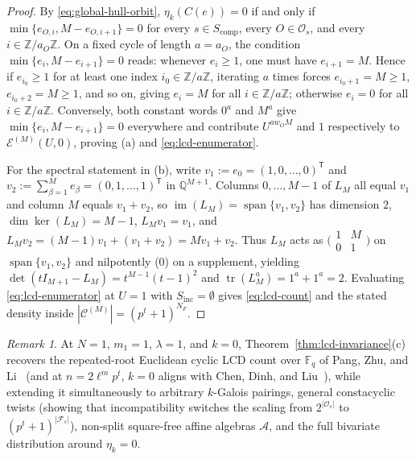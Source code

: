 \documentclass[preprint,12pt]{elsarticle}
\newcommand{\F}{\mathbb F}
\newcommand{\Z}{\mathbb Z}
\newcommand{\A}{\mathcal A}
\newcommand{\Fs}{\mathcal F_s}
\newcommand{\Os}{\mathcal O_s}
\newcommand{\Epoly}{\mathscr E}
\newcommand{\tr}{\operatorname{tr}}
\numberwithin{equation}{section}
\theoremstyle{plain}
\theoremstyle{definition}
\theoremstyle{remark}
\newtheorem{remark}[theorem]{Remark}
\begin{document}
\begin{proof}
By \eqref{eq:global-hull-orbit}, $\eta_k(C(e))=0$ if and only if
$\min\{e_{O,i},M-e_{O,i+1}\}=0$ for every $s\in S_{\mathrm{comp}}$, every
$O\in\Os$, and every $i\in\Z/a_O\Z$. On a fixed cycle of length $a=a_O$, the
condition $\min\{e_i,M-e_{i+1}\}=0$ reads: whenever $e_i\ge 1$, one must have
$e_{i+1}=M$. Hence if $e_{i_0}\ge 1$ for at least one index $i_0\in\Z/a\Z$,
iterating $a$ times forces $e_{i_0+1}=M\ge 1$, $e_{i_0+2}=M\ge 1$, and so on,
giving $e_i=M$ for all $i\in\Z/a\Z$; otherwise $e_i=0$ for all $i\in\Z/a\Z$.
Conversely, both constant words $0^a$ and $M^a$ give $\min\{e_i,M-e_{i+1}\}=0$
everywhere and contribute $U^{aw_OM}$ and $1$ respectively to $\Epoly^{(M)}(U,0)$,
proving \textup{(a)} and \eqref{eq:lcd-enumerator}.

For the spectral statement in \textup{(b)}, write $v_1:=e_0=(1,0,\dots,0)^{\mathsf T}$
and $v_2:=\sum_{\beta=1}^{M}e_\beta=(0,1,\dots,1)^{\mathsf T}$ in $\mathbb Q^{M+1}$.
Columns $0,\dots,M-1$ of $L_M$ all equal $v_1$ and column $M$ equals $v_1+v_2$, so
$\operatorname{im}(L_M)=\operatorname{span}\{v_1,v_2\}$ has dimension $2$,
$\dim\ker(L_M)=M-1$, $L_M v_1=v_1$, and
$L_M v_2=(M-1)v_1+(v_1+v_2)=Mv_1+v_2$. Thus $L_M$ acts as
$\bigl(\begin{smallmatrix}1 & M\\ 0 & 1\end{smallmatrix}\bigr)$ on
$\operatorname{span}\{v_1,v_2\}$ and nilpotently ($0$) on a supplement, yielding
$\det(tI_{M+1}-L_M)=t^{M-1}(t-1)^2$ and $\tr(L_M^a)=1^a+1^a=2$. Evaluating
\eqref{eq:lcd-enumerator} at $U=1$ with $S_{\mathrm{inc}}=\emptyset$ gives
\eqref{eq:lcd-count} and the stated density inside $|\mathscr C^{(M)}|=(p^t+1)^{N_F}$.
\end{proof}

\begin{remark}\label{rem:pang-chen}
At $N=1$, $m_1=1$, $\lambda=1$, and $k=0$, Theorem~\ref{thm:lcd-invariance}\textup{(c)}
recovers the repeated-root Euclidean cyclic LCD count over $\F_q$ of Pang, Zhu,
and Li~\cite{pangZhuLi2018} (and at $n=2\ell^m p^t$, $k=0$ aligns with
Chen, Dinh, and Liu~\cite{chenDinhLiu2015}), while extending it simultaneously to
arbitrary $k$-Galois pairings, general constacyclic twists (showing that
incompatibility switches the scaling from $2^{|\Os|}$ to $(p^t+1)^{|\Fs|}$),
non-split square-free affine algebras $\A$, and the full bivariate distribution
around $\eta_k=0$.
\end{remark}
\end{document}
